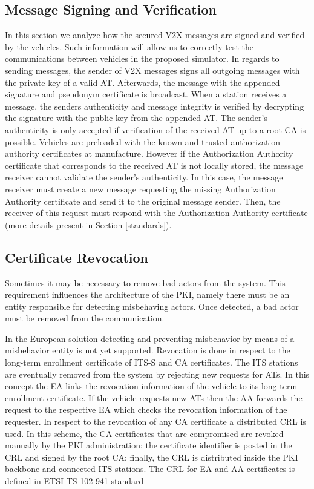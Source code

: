 \subsection{Message Signing and Verification}

In this section we analyze how the secured V2X messages are signed and verified by the vehicles. Such information will allow us to correctly test the communications between vehicles in the proposed simulator. In regards to sending messages, the sender of V2X messages signs all outgoing messages with the private key of a valid AT. Afterwards, the message with the appended signature and pseudonym certificate is broadcast. When a station receives a message, the senders authenticity and message integrity is verified by decrypting the signature with the public key from the appended AT. The sender's authenticity is only accepted if verification of the received AT up to a root CA is possible. Vehicles are preloaded with the known and trusted authorization authority certificates at manufacture. However if the Authorization Authority certificate that corresponds to the received AT is not locally stored, the message receiver cannot validate the sender's authenticity. In this case, the message receiver must create a new message requesting the missing Authorization Authority certificate and send it to the original message sender. Then, the receiver of this request must respond with the Authorization Authority certificate (more details present in Section \ref{standards}).

\subsection{Certificate Revocation}

Sometimes it may be necessary to remove bad actors from the system. This requirement influences the architecture of the PKI, namely there must be an entity responsible for detecting misbehaving actors. Once detected, a bad actor must be removed from the communication. 

In the European solution detecting and preventing misbehavior by means of a misbehavior entity is not yet supported. Revocation is done in respect to the long-term enrollment certificate of ITS-S and CA certificates. The ITS stations are eventually removed from the system by rejecting new requests for ATs. In this concept the EA links the revocation information of the vehicle to its long-term enrollment certificate. If the vehicle requests new ATs then the AA forwards the request to the respective EA which checks the revocation information of the requester. In respect to the revocation of any CA certificate a distributed CRL is used. In this scheme, the CA certificates that are compromised are revoked manually by the PKI administration; the certificate identifier is posted in the CRL and signed by the root CA; finally, the CRL is distributed inside the PKI backbone and connected ITS stations. The CRL for EA and AA certificates is defined in ETSI TS 102 941 \cite{etsi_privacy} standard

